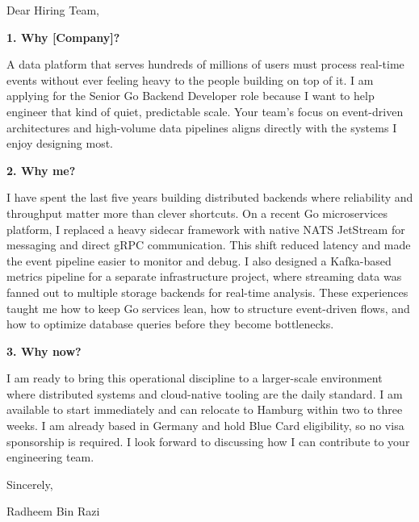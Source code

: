 \documentclass[11pt,a4paper]{coverletter}
\begin{document}

\opening{Dear Hiring Team,}

\vspace{8pt}\noindent\textbf{1. Why [Company]?}\par\vspace{3pt}

A data platform that serves hundreds of millions of users must process real-time events without ever feeling heavy to the people building on top of it. I am applying for the Senior Go Backend Developer role because I want to help engineer that kind of quiet, predictable scale. Your team’s focus on event-driven architectures and high-volume data pipelines aligns directly with the systems I enjoy designing most.

\vspace{8pt}\noindent\textbf{2. Why me?}\par\vspace{3pt}

I have spent the last five years building distributed backends where reliability and throughput matter more than clever shortcuts. On a recent Go microservices platform, I replaced a heavy sidecar framework with native NATS JetStream for messaging and direct gRPC communication. This shift reduced latency and made the event pipeline easier to monitor and debug. I also designed a Kafka-based metrics pipeline for a separate infrastructure project, where streaming data was fanned out to multiple storage backends for real-time analysis. These experiences taught me how to keep Go services lean, how to structure event-driven flows, and how to optimize database queries before they become bottlenecks.

\vspace{8pt}\noindent\textbf{3. Why now?}\par\vspace{3pt}

I am ready to bring this operational discipline to a larger-scale environment where distributed systems and cloud-native tooling are the daily standard. I am available to start immediately and can relocate to Hamburg within two to three weeks. I am already based in Germany and hold Blue Card eligibility, so no visa sponsorship is required. I look forward to discussing how I can contribute to your engineering team.

\closing{Sincerely,}{Radheem Bin Razi}

\clearpage
{}
\end{document}
